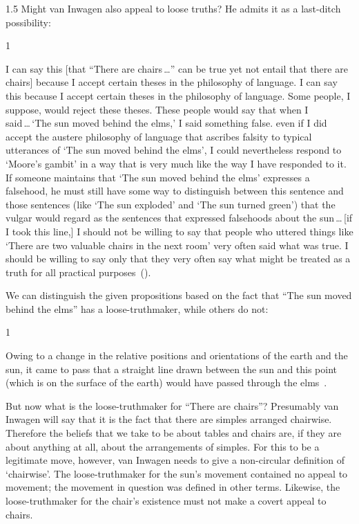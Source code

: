 \documentclass[11pt]{article}
\newenvironment{squote}{%
	\begin{spacing}{1}
	\begin{list}{}{%
	\setlength{\labelwidth}{0pt}%
	\rightmargin\leftmargin%
	}
	\item\relax
	}{%
	\end{list}%
	\end{spacing}
	}
\begin{document}
\begin{spacing}{1.5}
Might van Inwagen also appeal to loose truths? He admits it as a last-ditch possibility:
\begin{squote}
I can say this [that ``There are chairs\,\ldots '' can be true yet not entail that there are chairs] because I accept certain theses in the philosophy of language. I can say this because I accept certain theses in the philosophy of language. Some people, I suppose, would reject these theses. These people would say that when I said\,\ldots\,`The sun moved behind the elms,' I said something false. even if I did accept the austere philosophy of language that ascribes falsity to typical utterances of `The sun moved behind the elms', I could nevertheless respond to `Moore's gambit' in a way that is very much like the way I have responded to it. If someone maintains that `The sun moved behind the elms' expresses a falsehood, he must still have some way to distinguish between this sentence and those sentences (like `The sun exploded' and `The sun turned green') that the vulgar would regard as the sentences that expressed falsehoods about the sun\,\ldots\,[if I took this line,] I should not be willing to say that people who uttered things like `There are two valuable chairs in the next room' very often said what was true. I should be willing to say only that they very often say what might be treated as a truth for all practical purposes~(\citeyear[102--103]{inwagen1995}).
\end{squote}
We can distinguish the given propositions based on the fact that ``The sun moved behind the elms'' has a loose-truthmaker, while others do not:
\begin{squote}
Owing to a change in the relative positions and orientations of the earth and the sun, it came to pass that a straight line drawn between the sun and this point (which is on the surface of the earth) would have passed through the elms~\citep[112--113]{inwagen1995}.
\end{squote}

But now what is the loose-truthmaker for ``There are chairs''? Presumably van Inwagen will say that it is the fact that there are simples arranged chairwise. Therefore the beliefs that we take to be about tables and chairs are, if they are about anything at all, about the arrangements of simples. For this to be a legitimate move, however, van Inwagen needs to give a non-circular definition of `chairwise'. The loose-truthmaker for the sun's movement contained no appeal to movement; the movement in question was defined in other terms. Likewise, the loose-truthmaker for the chair's existence must not make a covert appeal to chairs.


\end{spacing}
\end{document}
